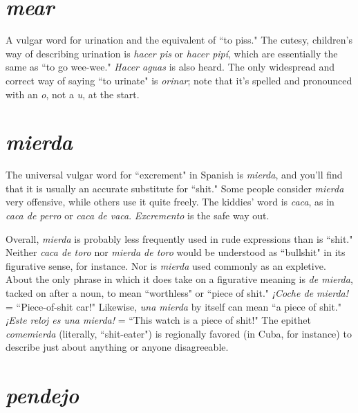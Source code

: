 \section{\emph{mear}}

A vulgar word for urination and the equivalent of ``to piss."
The cutesy, children's way of describing urination is \emph{hacer pis} or \emph{hacer
pipí}, which are essentially the same as ``to go wee-wee." \emph{Hacer aguas}
is also heard. The only widespread and correct way of saying ``to urinate" is \emph{orinar}; note that it's spelled and pronounced with an \emph{o}, not a
\emph{u}, at the start.

\section{\emph{mierda}}

The universal vulgar word for ``excrement" in Spanish is
\emph{mierda}, and you'll find that it is usually an accurate substitute for
``shit." Some people consider \emph{mierda} very offensive, while others use it
quite freely. The kiddies' word is \emph{caca}, as in \emph{caca de perro} or \emph{caca de
vaca}. \emph{Excremento} is the safe way out.

Overall, \emph{mierda} is probably less frequently used in rude expressions than is ``shit." Neither \emph{caca de toro} nor \emph{mierda de toro}
would be understood as ``bullshit" in its figurative sense, for instance.
Nor is \emph{mierda} used commonly as an expletive. About the only phrase
in which it does take on a figurative meaning is \emph{de mierda}, tacked
on after a noun, to mean ``worthless" or ``piece of shit." \emph{¡Coche de
mierda!} = ``Piece-of-shit car!" Likewise, \emph{una mierda} by itself can
mean ``a piece of shit." \emph{¡Este reloj es una mierda!} = ``This watch is a
piece of shit!" The epithet \emph{comemierda} (literally, ``shit-eater") is regionally favored (in Cuba, for instance) to describe just about anything
or anyone disagreeable.

\section{\emph{pendejo}}

